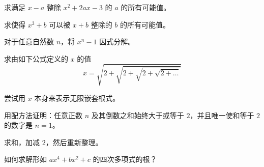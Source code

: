 \begin{problem}
    求满足 $x-a$ 整除 $x^2+2ax-3$ 的 $a$ 的所有可能值。
\end{problem}
\begin{problem}
    求使得 $x^3 + b$ 可以被 $x + b$ 整除的 $b$ 的所有可能值。
\end{problem}
\begin{problem}
    对于任意自然数 $n$，将 $x^n - 1$ 因式分解。
\end{problem}
\begin{problem}
    求由如下公式定义的 $x$ 的值
    \[x = \sqrt{2+\sqrt{2+\sqrt{2+\sqrt{2+\dots}}}}\]
    \begin{hint}
        尝试用 $x$ 本身来表示无限嵌套根式。
    \end{hint}
\end{problem}
\begin{problem}
    用配方法证明：任意正数 $n$ 及其倒数之和始终大于或等于 $2$，并且唯一使和等于 $2$ 的数字是 $n = 1$。
    \begin{hint}
        求和，加减 $2$，然后重新整理。
    \end{hint}
\end{problem}
\begin{problem}
    如何求解形如 $ax^4 + bx^2 + c$ 的四次多项式的根？
\end{problem}
